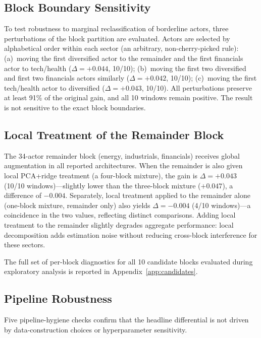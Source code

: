 \documentclass[11pt,a4paper]{article}
\begin{document}
\subsection{Block Boundary Sensitivity}

To test robustness to marginal reclassification of borderline actors, three perturbations of the block partition are evaluated. Actors are selected by alphabetical order within each sector (an arbitrary, non-cherry-picked rule): (a)~moving the first diversified actor to the remainder and the first financials actor to tech/health ($\Delta = +0.044$, 10/10); (b)~moving the first two diversified and first two financials actors similarly ($\Delta = +0.042$, 10/10); (c)~moving the first tech/health actor to diversified ($\Delta = +0.043$, 10/10). All perturbations preserve at least 91\% of the original gain, and all 10 windows remain positive. The result is not sensitive to the exact block boundaries.

\subsection{Local Treatment of the Remainder Block}

The 34-actor remainder block (energy, industrials, financials) receives global augmentation in all reported architectures. When the remainder is also given local PCA+ridge treatment (a four-block mixture), the gain is $\Delta = +0.043$ (10/10 windows)---slightly lower than the three-block mixture ($+0.047$), a difference of $-0.004$. Separately, local treatment applied to the remainder alone (one-block mixture, remainder only) also yields $\Delta = -0.004$ (4/10 windows)---a coincidence in the two values, reflecting distinct comparisons. Adding local treatment to the remainder slightly degrades aggregate performance: local decomposition adds estimation noise without reducing cross-block interference for these sectors.

The full set of per-block diagnostics for all 10 candidate blocks evaluated during exploratory analysis is reported in Appendix~\ref{app:candidates}.

\subsection{Pipeline Robustness}

Five pipeline-hygiene checks confirm that the headline differential is not driven by data-construction choices or hyperparameter sensitivity.
\end{document}

